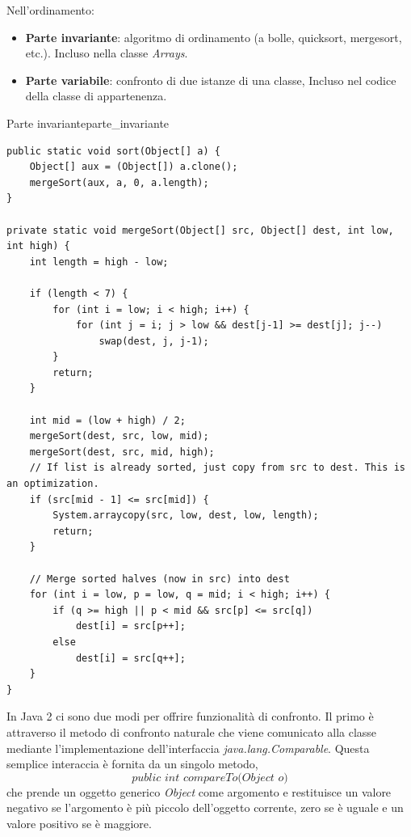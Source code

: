 \documentclass[12pt]{report}
\newcommand{\nmu}{}
\begin{document}
Nell'ordinamento:
\begin{itemize}
	\item \textbf{Parte invariante}: algoritmo di ordinamento (a bolle, quicksort, mergesort, etc.). Incluso nella classe \textit{Arrays}.
	\item \textbf{Parte variabile}: confronto di due istanze di una classe, Incluso nel codice della classe di appartenenza.
\end{itemize}
\begin{example}{\nmu Parte invariante}{parte_invariante}
\begin{lstlisting}[style=javastyle]
public static void sort(Object[] a) {
	Object[] aux = (Object[]) a.clone();
	mergeSort(aux, a, 0, a.length);
}

private static void mergeSort(Object[] src, Object[] dest, int low, int high) {
	int length = high - low;

	if (length < 7) {
		for (int i = low; i < high; i++) {
			for (int j = i; j > low && dest[j-1] >= dest[j]; j--)
				swap(dest, j, j-1);
		}
		return;
	}

	int mid = (low + high) / 2;
	mergeSort(dest, src, low, mid);
	mergeSort(dest, src, mid, high);
	// If list is already sorted, just copy from src to dest. This is an optimization.
	if (src[mid - 1] <= src[mid]) {
		System.arraycopy(src, low, dest, low, length);
		return;
	}

	// Merge sorted halves (now in src) into dest
	for (int i = low, p = low, q = mid; i < high; i++) {
		if (q >= high || p < mid && src[p] <= src[q])
			dest[i] = src[p++];
		else
			dest[i] = src[q++];
	}
}
\end{lstlisting}
\end{example}
In Java 2 ci sono due modi per offrire funzionalità di confronto. Il primo è attraverso il metodo di confronto naturale che viene comunicato alla classe mediante l'implementazione dell'interfaccia \textit{java.lang.Comparable}. Questa semplice interaccia è fornita da un singolo metodo,
\[
\textit{public int compareTo(Object o)}
\]
che prende un oggetto generico \textit{Object} come argomento e restituisce un valore negativo se l'argomento è più piccolo dell'oggetto corrente, zero se è uguale e un valore positivo se è maggiore.
\end{document}
